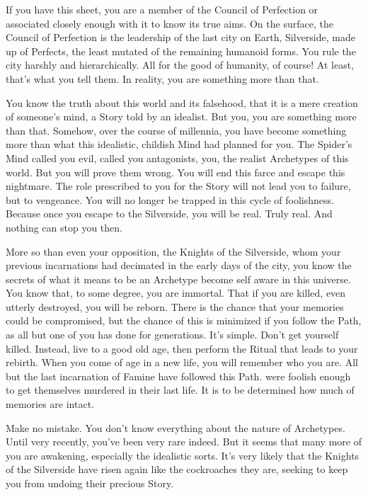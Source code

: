 \documentclass[blue]{Silversiders}
\begin{document}
\name{\bCouncil{}}

If you have this sheet, you are a member of the Council of Perfection or associated closely enough with it to know its true aims. On the surface, the Council of Perfection is the leadership of the last city on Earth, Silverside, made up of Perfects, the least mutated of the remaining humanoid forms. You rule the city harshly and hierarchically. All for the good of humanity, of course! At least, that's what you tell them. In reality, you are something more than that.

You know the truth about this world and its falsehood, that it is a mere creation of someone's mind, a Story told by an idealist. But you, you are something more than that. Somehow, over the course of millennia, you have become something more than what this idealistic, childish Mind had planned for you. The Spider's Mind called you evil, called you antagonists, you, the realist Archetypes of this world. But you will prove them wrong. You will end this farce and escape this nightmare. The role prescribed to you for the Story will not lead you to failure, but to vengeance. You will no longer be trapped in this cycle of foolishness. Because once you escape to the Silverside, you will be real. Truly real. And nothing can stop you then.

More so than even your opposition, the Knights of the Silverside, whom your previous incarnations had decimated in the early days of the city, you know the secrets of what it means to be an Archetype become self aware in this universe. You know that, to some degree, you are immortal. That if you are killed, even utterly destroyed, you will be reborn. There is the chance that your memories could be compromised, but the chance of this is minimized if you follow the Path, as all but one of you has done for generations. It's simple. Don't get yourself killed. Instead, live to a good old age, then perform the Ritual that leads to your rebirth. When you come of age in a new life, you will remember who you are. All but the last incarnation of Famine have followed this Path. \cFamine{\They} were foolish enough to get themselves murdered in their last life. It is to be determined how much of \cFamine{\their} memories are intact.

Make no mistake. You don't know everything about the nature of Archetypes. Until very recently, you've been very rare indeed. But it seems that many more of you are awakening, especially the idealistic sorts. It's very likely that the Knights of the Silverside have risen again like the cockroaches they are, seeking to keep you from undoing their precious Story.
\end{document}
